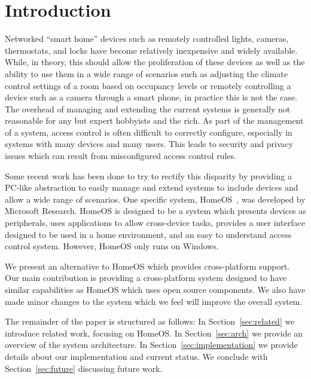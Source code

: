 \section{Introduction}
\label{sec:intro}
Networked ``smart home'' devices such as remotely controlled lights, cameras,
thermostats, and locks have become relatively inexpensive and widely available.
While, in theory, this should allow the proliferation of these devices as well
as the ability to use them in a wide range of scenarios such as adjusting the
climate control settings of a room based on occupancy levels or remotely
controlling a device such as a camera through a smart phone, in practice this is
not the case. The overhead of managing and extending the current systems is
generally not reasonable for any but expert hobbyists and the rich. As part of
the management of a system, access control is often difficult to correctly
configure, especially in systems with many devices and many users. This leads to
security and privacy issues which can result from misconfigured access control
rules.

Some recent work has been done to try to rectify this disparity by providing a
PC-like abstraction to easily manage and extend systems to include devices and
allow a wide range of scenarios. One specific system, HomeOS~\cite{homeOS}, was
developed by Microsoft Research. HomeOS is designed to be a system which
presents devices as peripherals, uses applications to allow cross-device tasks,
provides a user interface designed to be used in a home environment, and an easy
to understand access control system. However, HomeOS only runs on Windows.

We present an alternative to HomeOS which provides cross-platform support. Our
main contribution is providing a cross-platform system designed to have similar
capabilities as HomeOS which uses open source components. We also have made
minor changes to the system which we feel will improve the overall system.

The remainder of the paper is structured as follows: In
Section~\ref{sec:related} we introduce related work, focusing on HomeOS. In
Section~\ref{sec:arch} we provide an overview of the system architecture. In
Section~\ref{sec:implementation} we provide details about our implementation and
current status. We conclude with Section~\ref{sec:future} discussing future
work.
